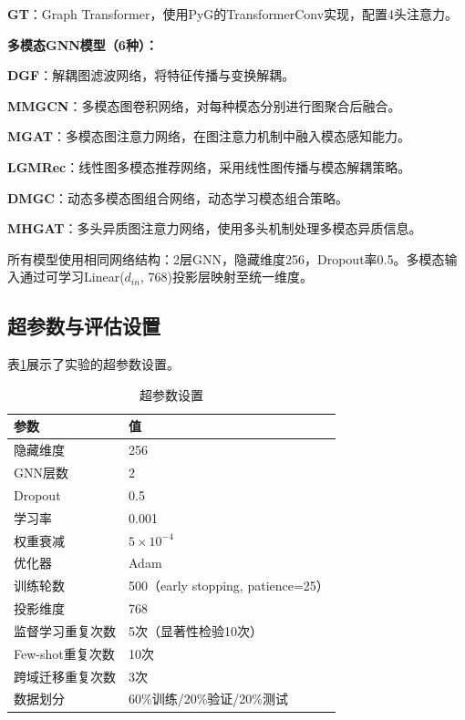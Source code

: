 \textbf{GT}：Graph Transformer，使用PyG\cite{fey2019pyg}的TransformerConv实现，配置4头注意力。

\textbf{多模态GNN模型（6种）：}

\textbf{DGF}：解耦图滤波网络，将特征传播与变换解耦。

\textbf{MMGCN}：多模态图卷积网络，对每种模态分别进行图聚合后融合。

\textbf{MGAT}：多模态图注意力网络，在图注意力机制中融入模态感知能力。

\textbf{LGMRec}：线性图多模态推荐网络，采用线性图传播与模态解耦策略。

\textbf{DMGC}：动态多模态图组合网络，动态学习模态组合策略。

\textbf{MHGAT}：多头异质图注意力网络，使用多头机制处理多模态异质信息。

所有模型使用相同网络结构：2层GNN，隐藏维度256，Dropout率0.5。多模态输入通过可学习Linear($d_{in}$, 768)投影层映射至统一维度。

\subsection{超参数与评估设置}

表\ref{tab:hyperparams}展示了实验的超参数设置。

\begin{table}[htbp]
  \centering
  \caption{超参数设置}
  \label{tab:hyperparams}
  \begin{tabular}{ll}
    \toprule
    参数 & 值 \\
    \midrule
    隐藏维度 & 256 \\
    GNN层数 & 2 \\
    Dropout & 0.5 \\
    学习率 & 0.001 \\
    权重衰减 & $5 \times 10^{-4}$ \\
    优化器 & Adam \\
    训练轮数 & 500（early stopping, patience=25） \\
    投影维度 & 768 \\
    监督学习重复次数 & 5次（显著性检验10次） \\
    Few-shot重复次数 & 10次 \\
    跨域迁移重复次数 & 3次 \\
    数据划分 & 60\%训练/20\%验证/20\%测试 \\
    \bottomrule
  \end{tabular}
\end{table}


